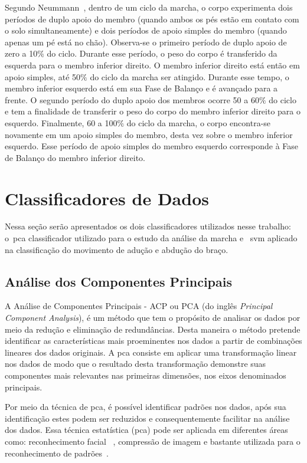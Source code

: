 Segundo Neummann~\cite{neumann2012cinesiologia}, dentro de um ciclo da marcha, o corpo experimenta dois períodos de duplo apoio do membro (quando ambos os pés estão em contato com o solo simultaneamente) e dois períodos de apoio simples do membro (quando apenas um pé está no chão). Observa-se o primeiro período de duplo apoio de zero a 10$\%$ do ciclo. Durante esse período, o peso do corpo é transferido da esquerda para o membro inferior direito. O membro inferior direito está então em apoio simples, até 50$\%$ do ciclo da marcha ser atingido. Durante esse tempo, o membro inferior esquerdo está em sua Fase de Balanço e é avançado para a frente. O segundo período do duplo apoio dos membros ocorre 50 a 60$\%$ do ciclo e tem a finalidade de transferir o peso do corpo do membro inferior direito para o esquerdo. Finalmente, 60 a 100$\%$ do ciclo da marcha, o corpo encontra-se novamente em um apoio simples do membro, desta vez sobre o membro inferior esquerdo. Esse período de apoio simples do membro esquerdo corresponde à Fase de Balanço do membro inferior direito.



\section{Classificadores de Dados}
Nessa seção serão apresentados os dois classificadores utilizados nesse trabalho: o~\ac{pca} classificador utilizado para o estudo da análise da marcha e ~\ac{svm} aplicado na classificação do movimento de adução e abdução do braço.

\subsection{Análise dos Componentes Principais}\label{section:analise_pca}
A Análise de Componentes Principais - ACP ou PCA (do inglês \textit{Principal Component Analysis}), é um método que tem o propósito de analisar os dados por meio da redução e eliminação de redundâncias. Desta maneira o método pretende identificar as características mais proeminentes nos dados a partir de combinações lineares dos dados originais. A \ac{pca} consiste em aplicar uma transformação linear nos dados de modo que o resultado desta transformação demonstre suas componentes mais relevantes nas primeiras dimensões, nos eixos denominados principais.

Por meio da técnica de \ac{pca}, é possível identificar padrões nos dados, após sua identificação estes podem ser reduzidos e consequentemente facilitar na análise dos dados. Essa técnica estatística (\ac{pca}) pode ser aplicada em diferentes áreas como: reconhecimento facial ~\cite{eigenfaces91}, compressão de imagem e bastante utilizada para o reconhecimento de padrões~\cite{visionbased2009}. 

